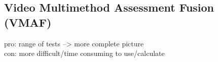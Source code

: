 \subsection{Video Multimethod Assessment Fusion (VMAF)}
pro: range of tests --> more complete picture\\
con: more difficult/time consuming to use/calculate

